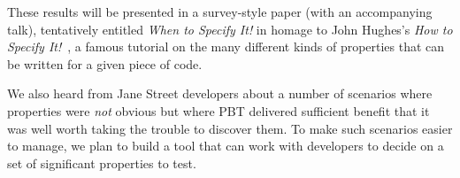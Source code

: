 These results will be presented in a survey-style paper (with an
accompanying talk), tentatively entitled {\em When to Specify It!} in
homage to John Hughes's {\em How to Specify
  It!}~\cite{HowToSpecifyIt}, a famous tutorial on the many different
kinds of properties that can be written for a given piece of code.






We also heard from Jane Street developers about a number of scenarios
where properties were {\em not} obvious but where PBT delivered
sufficient benefit that it was well worth taking the trouble to
discover them.  To make such scenarios easier to manage, we plan to
build a tool that can work with developers to decide on a set of
significant properties to test.

